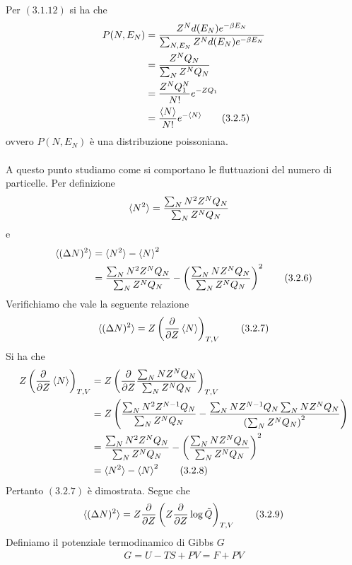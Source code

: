 \documentclass{article}
\begin{document}
Per $(3.1.12)$ si ha che 
\begin{align}
    P(N, E_N) &= \frac{Z^Nd(E_N)e^{-\beta E_N}}{\sum_{N, E_N}Z^Nd(E_N)e^{-\beta E_N}} \notag \\
    &= \frac{Z^NQ_N}{\sum_N Z^NQ_N} \notag \\
    &= \frac{Z^NQ^N_1}{N!}e^{-ZQ_1} \notag \\
    &= \frac{\braket{N}}{N!}e^{-\braket{N}} \tag{3.2.5}
\end{align}
ovvero $P(N, E_N)$ è una distribuzione poissoniana. \\ \\
A questo punto studiamo come si comportano le fluttuazioni del numero di particelle. Per definizione 
\begin{align}
    \braket{N^2} &= \frac{\sum_{N}N^2Z^NQ_N}{\sum_{N}Z^NQ_N} \notag
\end{align}
e 
\begin{align}
    \braket{(\Delta N)^2} &= \braket{N^2} - \braket{N}^2 \notag \\
    &= \frac{\sum_{N}N^2Z^NQ_N}{\sum_{N}Z^NQ_N} - \left(\frac{\sum_{N}NZ^NQ_N}{\sum_{N}Z^NQ_N}\right)^2 \tag{3.2.6}
\end{align}
Verifichiamo che vale la seguente relazione 
\begin{align}
    \braket{(\Delta N)^2} = Z\left(\frac{\partial}{\partial Z}\braket{N}\right)_{T, V} \tag{3.2.7}
\end{align}
Si ha che 
\begin{align}
    Z\left(\frac{\partial}{\partial Z}\braket{N}\right)_{T, V} &= Z\left(\frac{\partial}{\partial Z}\frac{\sum_{N}NZ^NQ_N}{\sum_{N}Z^NQ_N}\right)_{T, V} \notag \\
    &= Z\left(\frac{\sum_{N}N^2Z^{N - 1}Q_N}{\sum_{N}Z^NQ_N} - \frac{\sum_{N}NZ^{N - 1}Q_N\sum_{N}NZ^NQ_N}{\left(\sum_N Z^NQ_N\right)^2}\right) \notag \\
    &= \frac{\sum_{N}N^2Z^NQ_N}{\sum_{N}Z^NQ_N} - \left(\frac{\sum_{N}NZ^NQ_N}{\sum_{N}Z^NQ_N}\right)^2 \notag \\
    &= \braket{N^2} - \braket{N}^2 \tag{3.2.8}
\end{align}
Pertanto $(3.2.7)$ è dimostrata. Segue che 
\begin{align}
    \braket{(\Delta N)^2} = Z\frac{\partial}{\partial Z}\left(Z\frac{\partial}{\partial Z}\log \tilde{Q}\right)_{T, V} \tag{3.2.9}
\end{align}
Definiamo il potenziale termodinamico di Gibbs $G$
\begin{align}
    G = U - TS + PV = F + PV \tag{3.2.10}
\end{align}
\end{document}
